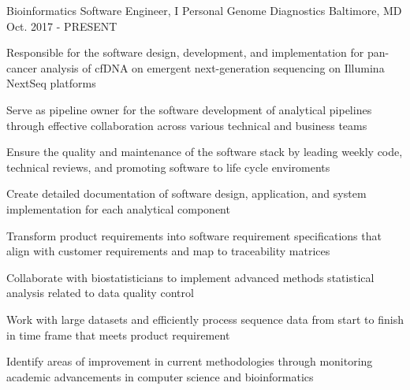 

\begin{cventries}

  \cventry
    {Bioinformatics Software Engineer, I} %
    {Personal Genome Diagnostics} %
    {Baltimore, MD} %
    {Oct. 2017 - PRESENT} %
    {
      \begin{cvitems} %
        \item{Responsible for the software design, development, and implementation for pan-cancer analysis of cfDNA on emergent next-generation sequencing on Illumina NextSeq platforms}
        \item{Serve as pipeline owner for the software development of analytical pipelines through effective collaboration across various technical and business teams}
        \item{Ensure the quality and maintenance of the software stack by leading weekly code, technical reviews, and promoting software to life cycle enviroments}
        \item{Create detailed documentation of software design, application, and system implementation for each analytical component}
        \item{Transform product requirements into software requirement specifications that align with customer requirements and map to traceability matrices}
        \item{Collaborate with biostatisticians to implement advanced methods statistical analysis related to data quality control}
        \item{Work with large datasets and efficiently process sequence data from start to finish in time frame that meets product requirement}
        \item{Identify areas of improvement in current methodologies through monitoring academic advancements in computer science and bioinformatics}
      \end{cvitems}
    }


\end{cventries}
